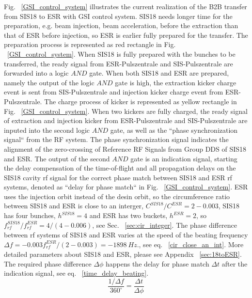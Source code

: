 Fig. ~\ref{GSI_control_system} illustrates the current realization of the B2B transfer from SIS18 to ESR with GSI control system. SIS18 needs longer time for the preparation, e.g. beam injection, beam acceleration, before the extraction than that of ESR before injection, so ESR is earlier fully prepared for the transfer. The preparation process is represented as red rectangle in Fig. ~\ref{GSI_control_system}. When SIS18 is fully prepared with the bunches to be transferred, the ready signal from ESR-Pulszentrale and SIS-Pulszentrale are forwarded into a logic $\textit{AND}$ gate. When both SIS18 and ESR are prepared, namely the output of the logic $\textit{AND}$ gate is high, the extraction kicker charge event is sent from SIS-Pulszentrale and injection kicker charge event from ESR-Pulszentrale. The charge process of kicker is represented as yellow rectangle in Fig. ~\ref{GSI_control_system}. When two kickers are fully charged, the ready signal of extraction and injection kicker from ESR-Pulszentrale and SIS-Pulszentrale are inputed into the second logic $\textit{AND}$ gate, as well as the ``phase synchronization signal`` from the RF system. The phase synchronization signal indicates the alignment of the zero-crossing of Reference RF Signals from Group DDS of SIS18 and ESR. The output of the second $\textit{AND}$ gate is an indication signal, starting the delay compensation of the time-of-flight and all propagation delays on the SIS18 cavity rf signal for the correct phase match between SIS18 and ESR rf systems, denoted as ``delay for phase match`` in Fig. ~\ref{GSI_control_system}. ESR uses the injection orbit instead of the desin orbit, so the circumference ratio between SIS18 and ESR is close to an interger, $C^{\mathit{SIS18}}/C^{\mathit{ESR}}=2-0.003$, SIS18 has four bunches, $h^{\mathit{SIS18}}=4$ and ESR has two buckets, $h^{\mathit{ESR}}=2$, so $f^{\mathit{SIS18}}_{\mathit{rf}}/f^{\mathit{ESR}}_{\mathit{rf}}=4/(4-0.006)$, see Sec. ~\ref{sec:cir_integer}. The phase difference between rf systems of SIS18 and ESR varies at the speed of the beating frequency $\Delta f=-0.003f^{\mathit{ESR}}_{\mathit{rf}}/(2-0.003)=-\SI{1898}{Hz}$., see eq. ~\ref{cir_close_an_int}. More detailed parameters about SIS18 and ESR, please see Appendix ~\ref{sec:18toESR}. The required phase difference $\Delta\phi$ happens the delay for phase match $\Delta t$ after the indication signal, see eq. ~\ref{time_delay_beating}. 
\begin{equation}
\frac{1/\Delta f}{360^\circ} = \frac{\Delta t}{\Delta \phi}\label{time_delay_beating}
\end{equation}

